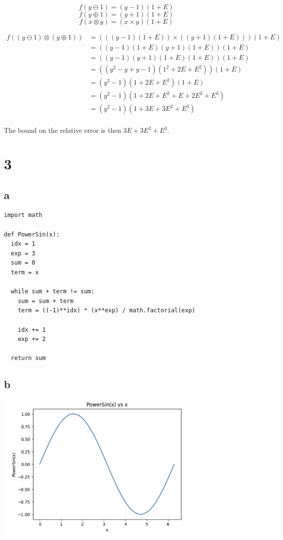 \documentclass[11pt]{article}
\begin{document}
\[ f(y \ominus 1) = (y - 1) (1 + E) \]
\[ f(y \oplus 1) = (y + 1) (1 + E) \]
\[ f(x \otimes y) = (x \times y) (1 + E) \]

\begin{align*}
    f((y \ominus 1) \otimes (y \oplus 1)) &= (((y - 1) (1 + E)) \times ((y + 1) (1 + E)))(1 + E) \\
    &= ((y-1)(1+E)(y+1)(1+E))(1 + E) \\
    &= ((y-1)(y+1)(1+E)(1+E))(1 + E) \\
    &= ((y^2 - y + y - 1)(1^2 + 2E + E^2))(1 + E) \\
    &= (y^2 - 1)(1 + 2E + E^2)(1 + E) \\
    &= (y^2 - 1)(1 + 2E + E^2 + E + 2E^2 + E^3) \\
    &= (y^2 - 1)(1 + 3E + 3E^2 + E^3) \\
\end{align*}

The bound on the relative error is then $3E + 3E^2 + E^3$.

\section{3}

\subsection{a}

\begin{verbatim}
import math

def PowerSin(x):
  idx = 1
  exp = 3
  sum = 0
  term = x

  while sum + term != sum:
    sum = sum + term
    term = ((-1)**idx) * (x**exp) / math.factorial(exp)

    idx += 1
    exp += 2
  
  return sum
\end{verbatim}

\subsection{b}

\includegraphics[width=300pt]{a1-3b.png}
\end{document}
